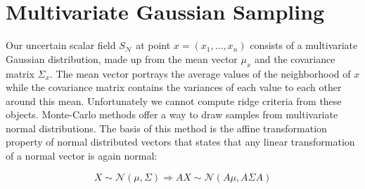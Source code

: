 \section{Multivariate Gaussian Sampling}\label{sec:MGS}

Our uncertain scalar field $S_{\mathcal{N}}$ at point
$x=(x_1,\dots,x_n)$ consists of a multivariate Gaussian distribution,
made up from the mean vector $\mu_x$ and the covariance matrix $\Sigma_x$. The
mean vector portrays the average values of the neighborhood of $x$ while
the covariance matrix contains the variances of each value to each other
around this mean. Unfortunately we cannot compute ridge criteria from
these objects. Monte-Carlo methods offer a way to draw samples from
multivariate normal distributions. The basis of this method is the affine
transformation property of normal distributed vectors that states that
any linear transformation of a normal vector is again normal:

\begin{equation}
    X \sim \mathcal{N}(\mu,\Sigma) \Rightarrow AX \sim \mathcal{N}(A\mu, A\Sigma A)
\end{equation}

